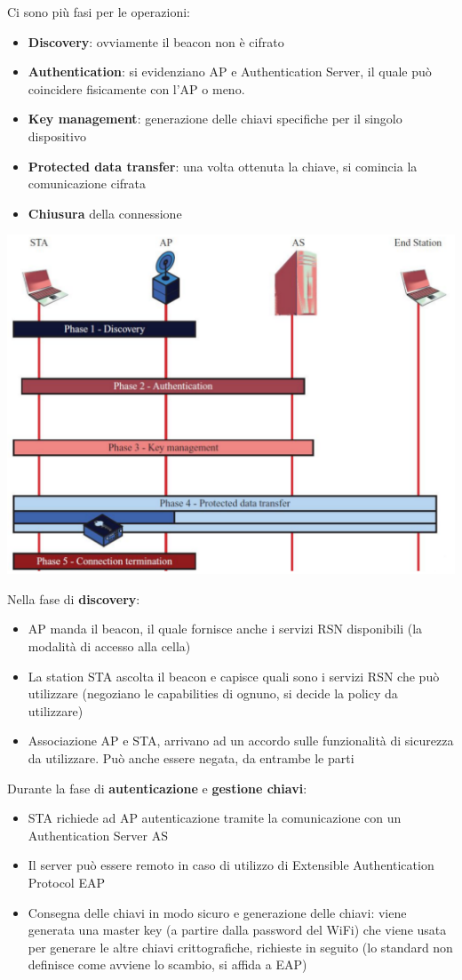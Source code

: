 Ci sono più fasi per le operazioni:
\begin{itemize}
	\item \textbf{Discovery}: ovviamente il beacon non è cifrato
	\item \textbf{Authentication}: si evidenziano AP e Authentication Server, il quale può coincidere fisicamente con l'AP o meno.
	\item \textbf{Key management}: generazione delle chiavi specifiche per il singolo dispositivo
	\item \textbf{Protected data transfer}: una volta ottenuta la chiave, si comincia la comunicazione cifrata
	\item \textbf{Chiusura} della connessione
\end{itemize} 
\begin{center}
	\includegraphics[width=0.85\linewidth]{img/wlan/fasop}
\end{center}

Nella fase di \textbf{discovery}: 
\begin{itemize}
	\item AP manda il beacon, il quale fornisce anche i servizi RSN disponibili (la modalità di accesso alla cella)
	\item La station STA ascolta il beacon e capisce quali sono i servizi RSN che può utilizzare (negoziano le capabilities di ognuno, si decide la policy da utilizzare)
	\item Associazione AP e STA, arrivano ad un accordo sulle funzionalità di sicurezza da utilizzare. Può anche essere negata, da entrambe le parti
\end{itemize}

Durante la fase di \textbf{autenticazione} e \textbf{gestione chiavi}: 
\begin{itemize}
	\item STA richiede ad AP autenticazione tramite la comunicazione con un Authentication Server AS
	\item Il server può essere remoto in caso di utilizzo di Extensible Authentication Protocol EAP
	\item Consegna delle chiavi in modo sicuro e generazione delle chiavi: viene generata una master key (a partire dalla password del WiFi) che viene usata per generare le altre chiavi crittografiche, richieste in seguito (lo standard non definisce come avviene lo scambio, si affida a EAP)
\end{itemize}

